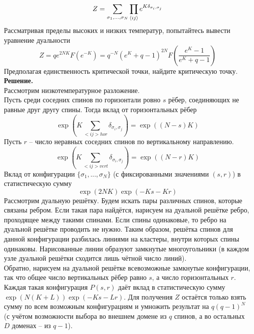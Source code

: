 \documentclass[12pt]{article}
\theoremstyle{definition}
\begin{document}
\begin{enumerate}
    \begin{equation}
        Z=\sum\limits_{\sigma_1,...,\sigma_N}\prod\limits_{\braket{ij}}e^{K\delta_{\sigma_i,\sigma_j}}
    \end{equation}
    Рассматривая пределы высоких и низких температур, попытайтесь вывести уравнение дуальности
    \begin{equation}
        Z=qe^{2NK}F(e^{-K})=q^{-N}(e^K+q-1)^{2N}F\left(\frac{e^K-1}{e^K+q-1}\right)
    \end{equation}
    Предполагая единственность критической точки, найдите критическую точку.\\
    \textbf{Решение.}\\
    Рассмотрим низкотемпературное разложение.\\
    Пусть среди соседних спинов по горизонтали ровно $s$ рёбер, соединяющих не равные друг другу спины. Тогда вклад от горизонтальных рёбер
    \begin{equation}
        \exp\left(K\sum\limits_{<ij>hor}\delta_{\sigma_i,\sigma_j}\right)=\exp((N-s)K)
    \end{equation}
    Пусть $r$ -- число неравных соседних спинов по вертикальному направлению.
    \begin{equation}
        \exp\left(K\sum\limits_{<ij>vert}\delta_{\sigma_i,\sigma_j}\right)=\exp((N-r)K)
    \end{equation}
    Вклад от конфигурации $\{\sigma_1,...,\sigma_N\}$ (с фиксированными значениями $(s,r)$) в статистическую сумму
    \begin{equation}
        \exp(2NK)\exp(-Ks-Kr)
    \end{equation}
    Рассмотрим дуальную решётку. Будем искать пары различных спинов, которые связаны ребром. Если такая пара найдётся, нарисуем на дуальной решётке ребро, проходящее между такими спинами. Если спины одинаковые, то ребро на дуальной решётке проводить не нужно. Таким образом, решётка спинов для данной конфигурации разбилась линиями на кластеры, внутри которых спины одинаковы. Нарисованные линии образуют замкнутые многоугольники (в каждом узле дуальной решётки сходится лишь чётной число линий).\\
    Обратно, нарисуем на дуальной решётке всевозможные замкнутые конфигурации, так что общее число вертикальных рёбер равно $s$, а число горизонтальных $r$. Каждая такая конфигурация $P(s,r)$ даёт вклад в статистическую сумму $\exp(N(K+L))\exp(-Ks-Lr)$. Для получения $Z$ остаётся только взять сумму по всем возможным конфигурациям и умножить результат на $q(q-1)^N$ (с учётом возможности выбора во внешнем домене из $q$ спинов, а во остальных $D$ доменах -- из $q-1$).

\end{enumerate}
\end{document}
